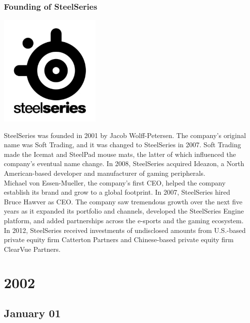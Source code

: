 \documentclass[11pt]{report}
\begin{document}
\subsection{Founding of SteelSeries}
\vspace{2mm}\begin{center}\includegraphics[width=5cm]{./img/steelseriesLogo.jpg}\end{center}
SteelSeries was founded in 2001 by Jacob Wolff-Petersen. The company's original name was Soft Trading, and it was changed to SteelSeries in 2007. Soft Trading made the Icemat and SteelPad mouse mats, the latter of which influenced the company's eventual name change. In 2008, SteelSeries acquired Ideazon, a North American-based developer and manufacturer of gaming peripherals.\\
\indent Michael von Essen-Mueller, the company's first CEO, helped the company establish its brand and grow to a global footprint. In 2007, SteelSeries hired Bruce Hawver as CEO. The company saw tremendous growth over the next five years as it expanded its portfolio and channels, developed the SteelSeries Engine platform, and added partnerships across the e-sports and the gaming ecosystem.\\
\indent In 2012, SteelSeries received investments of undisclosed amounts from U.S.-based private equity firm Catterton Partners and Chinese-based private equity firm ClearVue Partners.

\chapter{2002}
\section{January 01}
\end{document}
